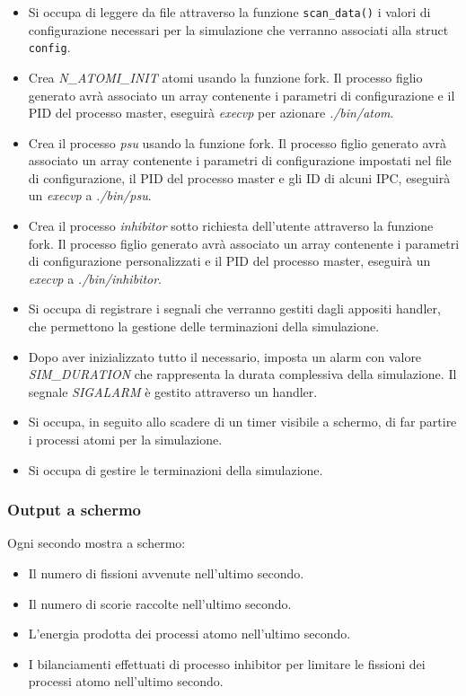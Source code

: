 \begin{itemize}
    \item Si occupa di leggere da file attraverso la funzione \lstinline|scan_data()| i valori di configurazione necessari per la simulazione che verranno associati alla struct \lstinline{config}. 
    \item Crea \textit{N\_ATOMI\_INIT} atomi usando la funzione fork. Il processo figlio generato avrà associato un array contenente i parametri di configurazione e il PID del processo master, eseguirà  \textit{execvp} per azionare \textit{./bin/atom}.
    \item Crea il processo \textit{psu} usando la funzione fork. Il processo figlio generato avrà associato un array contenente i parametri di configurazione impostati nel file di configurazione, il PID del processo master e gli ID di alcuni IPC, eseguirà un \textit{execvp} a \textit{./bin/psu}. 
    \item Crea il processo \textit{inhibitor} sotto richiesta dell'utente attraverso la funzione fork. Il processo figlio generato avrà associato un array contenente i parametri di configurazione personalizzati e il PID del processo master, eseguirà un \textit{execvp} a \textit{./bin/inhibitor}.
    \item Si occupa di registrare i segnali che verranno gestiti dagli appositi handler, che permettono la gestione delle terminazioni della simulazione. 
    \item Dopo aver inizializzato tutto il necessario, imposta un alarm con valore \textit{SIM\_DURATION} che rappresenta la durata complessiva della simulazione. Il segnale \textit{SIGALARM} è gestito attraverso un handler.
   
    \item Si occupa, in seguito allo scadere di un timer visibile a schermo, di far partire i processi atomi per la simulazione. 
    \item Si occupa di gestire le terminazioni della simulazione.
\end{itemize}

\subsubsection{Output a schermo}
Ogni secondo mostra a schermo: 
    \begin{itemize}
        \item Il numero di fissioni avvenute nell'ultimo secondo. 
        \item Il numero di scorie raccolte nell'ultimo secondo.
        \item L'energia prodotta dei processi atomo nell'ultimo secondo.
        \item I bilanciamenti effettuati di processo inhibitor per limitare le fissioni dei processi atomo nell'ultimo secondo. 
    \end{itemize}